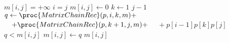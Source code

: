 \begin{codebox}
\li \If $m[i,j] = +\infty$
\li \Then \If $i = j$
\li     \Then
            $m[i,j] \gets 0$
\li     \Else 
\li         \For $k \gets 1$ \To $j-1$
\li         \Do
                $q \gets \proc{MatrixChainRec}(p,i,k,m)+$
\zi             $\quad + \proc{MatrixChainRec}(p,k+1,j,m)+$
\zi             $\quad + p[i-1]p[k]p[j]$
\li             \If $q < m[i,j]$
\li             \Then $m[i,j] \gets q$
                \End
            \End
        \End
    \End
\li \Return $m[i,j]$
\end{codebox}